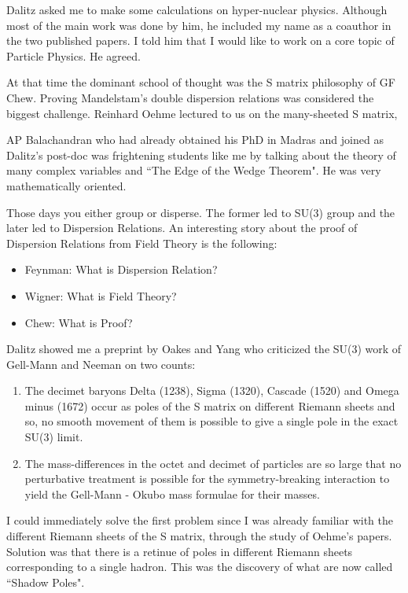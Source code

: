 Dalitz asked me to make some calculations on hyper-nuclear physics. 
Although most of the main work was done by him, he included my name as a 
coauthor in the two published papers. I told him that I would like to 
work on a core topic of Particle Physics. He agreed.
\smallskip

At that time the dominant school of thought was the S matrix philosophy 
of GF Chew. Proving Mandelstam's double dispersion relations was 
considered the biggest challenge. Reinhard Oehme lectured to us on the 
many-sheeted S matrix, 
\smallskip

AP Balachandran who had already obtained his PhD in Madras and joined as 
Dalitz's post-doc was frightening students like me by talking about the 
theory of many complex variables and ``The Edge of the Wedge Theorem". He 
was very mathematically oriented.
\smallskip

Those days you either group or disperse. The former led to SU(3) group 
and the later led to Dispersion Relations. An interesting story about 
the proof of Dispersion Relations from Field Theory is the following:
\eject

\begin{itemize}
\item Feynman: What is Dispersion Relation? 
\item Wigner: What is Field Theory? 
\item Chew: What is Proof?
\end{itemize}

Dalitz showed me a preprint by Oakes and Yang who criticized the SU(3) 
work of Gell-Mann and Neeman on two counts:

\begin{enumerate}
\item The decimet baryons Delta (1238), Sigma (1320), Cascade (1520) and 
Omega minus (1672) occur as poles of the S matrix on different Riemann 
sheets and so, no smooth movement of them is possible to give a single 
pole in the exact SU(3) limit.

\item The mass-differences in the octet and decimet of particles are so 
large that no perturbative treatment is possible for the 
symmetry-breaking interaction to yield the Gell-Mann - Okubo mass 
formulae for their masses.
\end{enumerate}

I could immediately solve the first problem since I was already familiar 
with the different Riemann sheets of the S matrix, through the study of 
Oehme's papers. Solution was that there is a retinue of poles in 
different Riemann sheets corresponding to a single hadron. This was the 
discovery of what are now called ``Shadow Poles".

